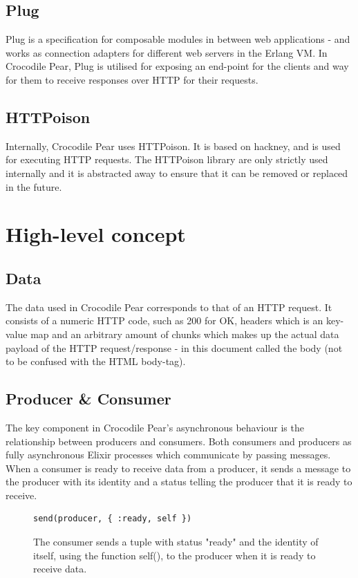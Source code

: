\documentclass{cslthse-msc}
\begin{document}
\subsection{Plug}
Plug is a specification for composable modules in between web applications - and works as connection adapters for different web servers in the Erlang VM\cite{plug}. In Crocodile Pear, Plug is utilised for exposing an end-point for the clients and way for them to receive responses over HTTP for their requests.

\subsection{HTTPoison}
Internally, Crocodile Pear uses HTTPoison\cite{httpoison}. It is based on hackney\cite{hackney}, and is used for executing HTTP requests. The HTTPoison library are only strictly used internally and it is abstracted away to ensure that it can be removed or replaced in the future. 

\section{High-level concept}

\subsection{Data}
The data used in Crocodile Pear corresponds to that of an HTTP request. It consists of a numeric HTTP code, such as 200 for OK, headers which is an key-value map and an arbitrary amount of chunks which makes up the actual data payload of the HTTP request/response - in this document called the body (not to be confused with the HTML body-tag).

\subsection{Producer \& Consumer}
The key component in Crocodile Pear's asynchronous behaviour is the relationship between producers and consumers. Both consumers and producers as fully asynchronous Elixir processes which communicate by passing messages. When a consumer is ready to receive data from a producer, it sends a message to the producer with its identity and a status telling the producer that it is ready to receive.

\begin{figure}[H]
  \centering
\begin{lstlisting}[breaklines=true,frame=single]
send(producer, { :ready, self })	
\end{lstlisting}
  \caption{The consumer sends a tuple with status "ready" and the identity of itself, using the function self(), to the producer when it is ready to receive data.}
\end{figure}
\end{document}
